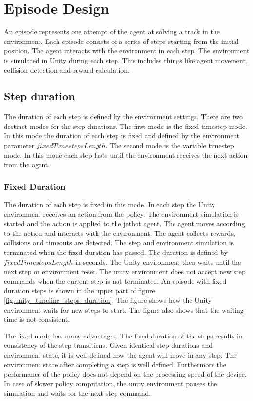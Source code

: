 \section{Episode Design}

An episode represents one attempt of the agent at solving a track in the environment. Each episode consists of a series of steps starting from the initial position. The agent interacts with the environment in each step. The environment is simulated in Unity during each step. This includes things like agent movement, collision detection and reward calculation.

\subsection{Step duration}
The duration of each step is defined by the environment settings. There are two destinct modes for the step durations. The first mode is the fixed timestep mode. In this mode the duration of each step is fixed and defined by the environment parameter $fixedTimestepsLength$. The second mode is the variable timestep mode. In this mode each step lasts until the environment receives the next action from the agent.

\subsubsection{Fixed Duration}

The duration of each step is fixed in this mode. In each step the Unity environment receives an action from the policy. The environment simulation is started and the action is applied to the jetbot agent. The agent moves according to the action and interacts with the environment. The agent collects rewards, collisions and timeouts are detected. The step and environment simulation is terminated when the fixed duration has passed. The duration is defined by $fixedTimestepsLength$ in seconds. The Unity environment then waits until the next step or environment reset. The unity environment does not accept new step commands when the current step is not terminated.
An episode with fixed duration steps is shown in the upper part of figure \ref{fig:unity_timeline_steps_duration}. The figure shows how the Unity environment waits for new steps to start. The figure also shows that the waiting time is not consistent.

The fixed mode has many advantages. The fixed duration of the steps results in consistency of the step transitions. Given identical step durations and environment state, it is well defined how the agent will move in any step. The environment state after completing a step is well defined.
Furthermore the performance of the policy does not depend on the processing speed of the device. In case of slower policy computation, the unity environment pauses the simulation and waits for the next step command.

